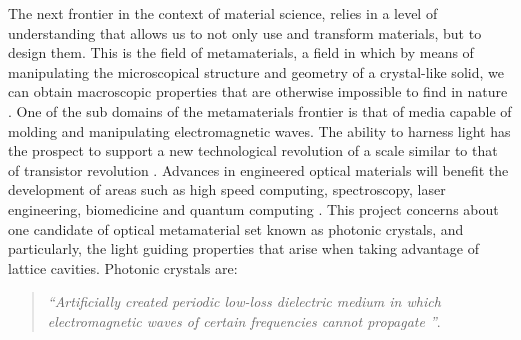 The next frontier in the context of material science, relies in a level of understanding that allows us to not only use and transform materials, but to design them. This is the field of metamaterials, a field in which by means of manipulating the microscopical structure and geometry of a crystal-like solid, we can obtain macroscopic properties that are otherwise impossible to find in nature \cite{Engheta2006, Capoliono2009}. One of the sub domains of the metamaterials frontier is that of media capable of molding and manipulating electromagnetic waves. The ability to harness light has the prospect to support a new technological revolution of a scale similar to that of transistor revolution \cite{Joannopoulos2008}.
Advances in engineered optical materials will benefit the development of areas such as high speed computing, spectroscopy, laser engineering, biomedicine and quantum computing \cite{Obayya2011}. 
This project concerns about one candidate of optical metamaterial set known as photonic crystals, and particularly, the light guiding properties that arise when taking advantage of lattice cavities.
Photonic crystals are: 

\begin{quote}
\textit{``Artificially created periodic low-loss dielectric medium in which electromagnetic waves of certain frequencies cannot propagate ''}\cite{GangBao1987}.  
\end{quote} 

